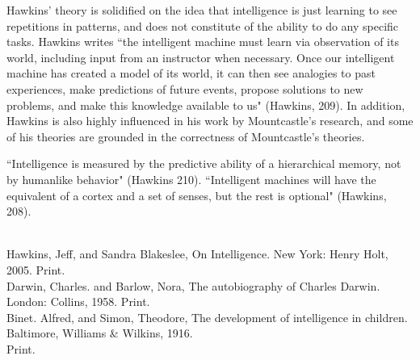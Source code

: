 \documentclass[11pt, oneside]{article}
\begin{document}
\par Hawkins' theory is solidified on the idea that intelligence is just learning to see repetitions in patterns, and does not constitute of the ability to do any specific tasks. Hawkins writes ``the intelligent machine must learn via observation of its world, including input from an instructor when necessary. Once our intelligent machine has created a model of its world, it can then see analogies to past experiences, make predictions of future events, propose solutions to new problems, and make this knowledge available to us" (Hawkins, 209). In addition, Hawkins is also highly influenced in his work by Mountcastle's research, and some of his theories are grounded in the correctness of Mountcastle's theories.

\par ``Intelligence is measured by the predictive ability of a hierarchical memory, not by humanlike behavior" (Hawkins 210). ``Intelligent machines will have the equivalent of a cortex and a set of senses, but the rest is optional" (Hawkins, 208). 

\noindent 

\begin{workscited}
\bibent \\
\bibent Hawkins, Jeff, and Sandra Blakeslee, On Intelligence. New York: Henry Holt, 2005. Print. \\
\bibent Darwin, Charles. and Barlow, Nora, The autobiography of Charles Darwin. London: Collins, 1958. Print. \\
\bibent Binet. Alfred, and Simon, Theodore, The development of intelligence in children. Baltimore, Williams \& Wilkins, 1916. \\
Print. \\
\end{workscited}
\end{document}
